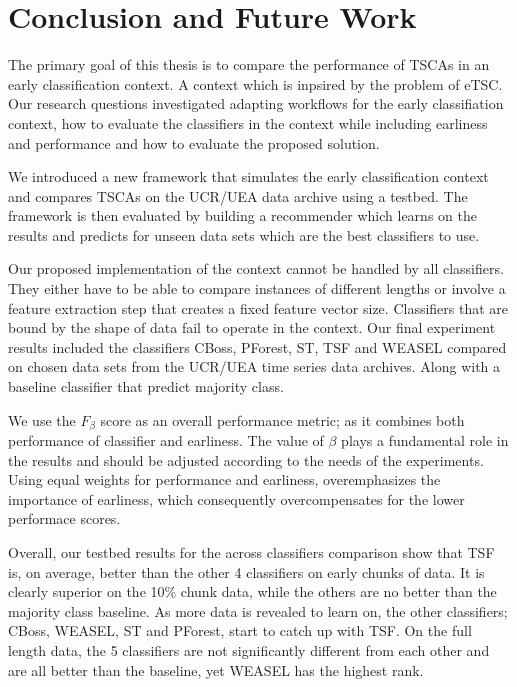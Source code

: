 \chapter{Conclusion and Future Work}
\label{ChapterConclusion}
The primary goal of this thesis is to compare the performance of TSCAs in an early classification context.
A context which is inpsired by the problem of eTSC. Our research questions investigated adapting workflows
for the early classifiation context, how to evaluate the classifiers in the context while including earliness and performance
and how to evaluate the proposed solution.

We introduced a new framework that simulates the early classification context and compares TSCAs on the UCR/UEA data archive using a testbed.
The framework is then evaluated by building a recommender which learns on the results and predicts for unseen data sets which are the best classifiers to use.

Our proposed implementation of the context cannot be handled by all classifiers.
They either have to be able to compare instances of different lengths or involve a feature extraction step that creates a fixed feature vector size.
Classifiers that are bound by the shape of data fail to operate in the context.
Our final experiment results included the classifiers CBoss, PForest, ST, TSF and WEASEL compared on chosen data sets from the UCR/UEA time series data archives.
Along with a baseline classifier that predict majority class.

We use the $F_{\beta}$ score as an overall performance metric; as it combines both performance of classifier and earliness.
The value of $\beta$ plays a fundamental role in the results and should be adjusted according to the needs of the experiments.
Using equal weights for performance and earliness, overemphasizes the importance of earliness, which consequently overcompensates for the lower performace scores.

Overall, our testbed results for the across classifiers comparison show that TSF is, on average, better than the other 4 classifiers on early chunks of data.
It is clearly superior on the 10\% chunk data, while the others are no better than the majority class baseline.
As more data is revealed to learn on, the other classifiers; CBoss, WEASEL, ST and PForest, start to catch up with TSF.
On the full length data, the 5 classifiers are not significantly different from each other and are all better than the baseline, yet WEASEL has the highest rank.

